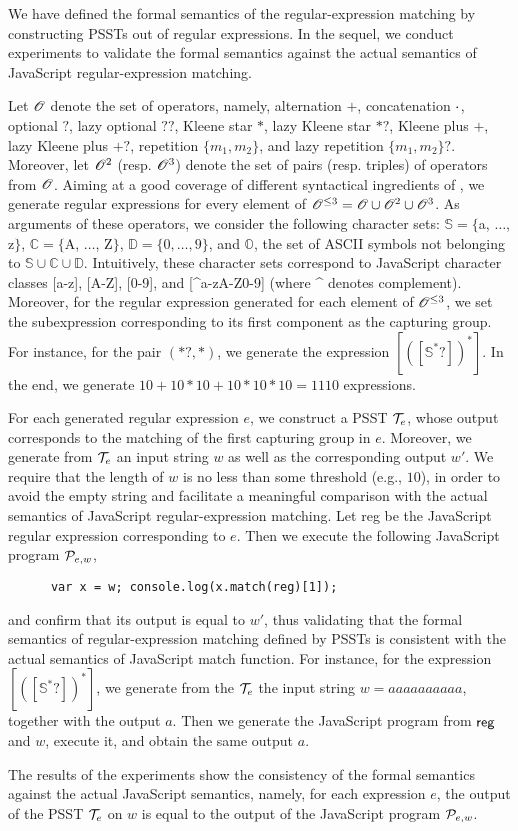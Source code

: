 
We have defined the formal semantics of the regular-expression matching by constructing PSSTs out of regular expressions. 
In the sequel, we conduct experiments to validate the formal semantics against the actual semantics of JavaScript regular-expression matching.

Let $\mathscr{O}$ denote the set of {\regexp} operators, namely, alternation $+$, concatenation $\cdot$, optional $?$, lazy optional $??$, Kleene star $*$, lazy Kleene star $*?$, Kleene plus $+$, lazy Kleene plus $+?$, repetition $\{m_1,m_2\}$, and lazy repetition $\{m_1,m_2\}?$. Moreover, let $\mathscr{O}^{2}$ (resp. $\mathscr{O}^{3}$) denote the set of pairs (resp. triples) of operators from $\mathscr{O}$. 
Aiming at a good coverage of different syntactical ingredients of {\regexp}, we generate regular expressions for every element of $\mathscr{O}^{\le 3} = \mathscr{O} \cup \mathscr{O}^2 \cup \mathscr{O}^3$.
As arguments of these operators, we consider the following character sets: $\mathbb{S} = \{$a, $\ldots$, z$\}$, $\mathbb{C}=\{$A, $\ldots$, Z$\}$, $\mathbb{D} = \{0,\ldots,9\}$, and $\mathbb{O}$, the set of ASCII symbols not belonging to $\mathbb{S} \cup \mathbb{C} \cup \mathbb{D}$.
Intuitively, these character sets correspond to JavaScript character classes [a-z], [A-Z], [0-9], and [{\textasciicircum}a-zA-Z0-9] (where {\textasciicircum} denotes complement).
Moreover, for the regular expression generated for each element of $\mathscr{O}^{\le 3}$, we set the subexpression corresponding to its first component as the capturing group. 
For instance, for the pair $(*?, *)$, we generate the {\regexp} expression $[([\mathbb{S}^*?])^{*}]$. In the end, we generate $10+10*10+10*10*10 = 1110$ {\regexp} expressions. 

For each generated regular expression $e$, we construct a PSST $\mathcal{T}_e$, whose output corresponds to the matching of the first capturing group in $e$.  Moreover, we generate from $\mathcal{T}_e$ an input string $w$ as well as the corresponding output $w'$. We require that the length of $w$ is no less than some threshold (e.g., $10$), in order to avoid the empty string and facilitate a  meaningful comparison with the actual semantics of JavaScript regular-expression matching. 
Let {\sf reg} be the JavaScript regular expression corresponding to $e$. Then we execute the following JavaScript program $\mathcal{P}_{e,w}$,
\begin{center}
{
\small
\begin{verbatim}
      var x = w; console.log(x.match(reg)[1]);
\end{verbatim}
}
\end{center}
and confirm that its output is equal to $w'$, thus validating that the formal semantics of  regular-expression matching defined by PSSTs is consistent with the actual semantics of JavaScript {\sf match} function. For instance, for the {\regexp} expression $[([\mathbb{S}^*?])^{*}]$, we generate from the $\mathcal{T}_e$ the input string $w= aaaaaaaaaa$, together with the output $a$. Then we generate  the JavaScript program from ${\sf reg}$ and $w$, execute it, and obtain the same output $a$.

The results of the experiments show the consistency of the formal semantics against the actual JavaScript semantics, namely, for each {\regexp} expression $e$, the output of the PSST $\mathcal{T}_e$ on $w$ is equal to the output of the JavaScript program $\mathcal{P}_{e,w}$.